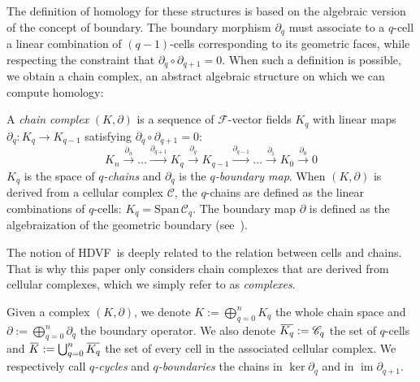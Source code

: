 \documentclass[runningheads]{llncs}
\DeclareMathOperator{\im}{im}	%
\newcommand\Span{\mathrm{Span}\,}
\newcommand{\dr}{\partial}
\newcommand{\cplxarrow}[1]{\overset{\partial_{#1}}{\longrightarrow}}
\newcommand{\ols}[1]{\mskip.5\thinmuskip\overline{\mskip-.5\thinmuskip {#1} \mskip-.5\thinmuskip}\mskip.5\thinmuskip} %
\newcommand{\HC}{HDVF}
\newcommand{\commentAldo}[1]{{\textit{\color{orange}\textbf{Aldo}: #1}}}
\newcommand{\commentAlex}[1]{{\textit{\color{magenta}#1}}}
\begin{document}
The definition of homology for these structures is based on the algebraic version of the concept of boundary.
The boundary morphism $\dr_q$ must associate to a $q$-cell a linear combination of $(q-1)$-cells corresponding to its geometric faces, while respecting the constraint that $\dr_{q} \circ \dr_{q+1} = 0$.
When such a definition is possible, we obtain a chain complex, an abstract algebraic structure on which we can compute homology:
\begin{definition}\label{def:chain-complex}
    A \emph{chain complex} $(K,\dr)$ is a sequence of $\mathcal{F}$-vector fields $K_q$ with linear maps $\dr_q: K_q \to K_{q-1}$ satisfying $\dr_{q} \circ \dr_{q+1} = 0$:
    $$
	K_n \cplxarrow{n} \dots \cplxarrow{q+1} K_q \cplxarrow{q} K_{q-1} \cplxarrow{q-1} \dots \cplxarrow{1} K_{0} \cplxarrow{0} 0
	$$
    $K_q$ is the space of \emph{$q$-chains} and $\dr_q$ is the \emph{$q$-boundary map}.
    When $(K,\dr)$ is derived from a cellular complex $\mathscr C$, the $q$-chains are defined as the linear combinations of $q$-cells: $K_q = \Span\mathscr C_q$.
    The boundary map $\dr$ is defined as the algebraization of the geometric boundary (see~\cite{hatcher-algebraic_topology}).
\end{definition}
The notion of \HC\ is deeply related to the relation between cells and chains.
That is why this paper only considers chain complexes that are derived from cellular complexes, which we simply refer to as \textit{complexes}.

Given a complex $(K,\dr)$, we denote $K := \bigoplus_{q=0}^n K_q$ the whole chain space and $\dr := \bigoplus_{q=0}^n \dr_q$ the boundary operator.
We also denote $\ols{K_q} := \mathscr{C}_q$ the set of $q$-cells and $\ols{K} := \bigcup_{q=0}^n \ols{K_q}$ the set of every cell in the associated cellular complex.
We respectively call \emph{$q$-cycles} and \emph{$q$-boundaries} the chains in $\ker\dr_q$ and in $\im\dr_{q+1}$.


\end{document}
